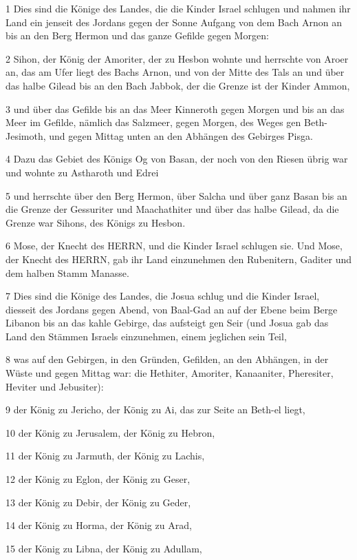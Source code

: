 \par 1 Dies sind die Könige des Landes, die die Kinder Israel schlugen und nahmen ihr Land ein jenseit des Jordans gegen der Sonne Aufgang von dem Bach Arnon an bis an den Berg Hermon und das ganze Gefilde gegen Morgen:
\par 2 Sihon, der König der Amoriter, der zu Hesbon wohnte und herrschte von Aroer an, das am Ufer liegt des Bachs Arnon, und von der Mitte des Tals an und über das halbe Gilead bis an den Bach Jabbok, der die Grenze ist der Kinder Ammon,
\par 3 und über das Gefilde bis an das Meer Kinneroth gegen Morgen und bis an das Meer im Gefilde, nämlich das Salzmeer, gegen Morgen, des Weges gen Beth-Jesimoth, und gegen Mittag unten an den Abhängen des Gebirges Pisga.
\par 4 Dazu das Gebiet des Königs Og von Basan, der noch von den Riesen übrig war und wohnte zu Astharoth und Edrei
\par 5 und herrschte über den Berg Hermon, über Salcha und über ganz Basan bis an die Grenze der Gessuriter und Maachathiter und über das halbe Gilead, da die Grenze war Sihons, des Königs zu Hesbon.
\par 6 Mose, der Knecht des HERRN, und die Kinder Israel schlugen sie. Und Mose, der Knecht des HERRN, gab ihr Land einzunehmen den Rubenitern, Gaditer und dem halben Stamm Manasse.
\par 7 Dies sind die Könige des Landes, die Josua schlug und die Kinder Israel, diesseit des Jordans gegen Abend, von Baal-Gad an auf der Ebene beim Berge Libanon bis an das kahle Gebirge, das aufsteigt gen Seir (und Josua gab das Land den Stämmen Israels einzunehmen, einem jeglichen sein Teil,
\par 8 was auf den Gebirgen, in den Gründen, Gefilden, an den Abhängen, in der Wüste und gegen Mittag war: die Hethiter, Amoriter, Kanaaniter, Pheresiter, Heviter und Jebusiter):
\par 9 der König zu Jericho, der König zu Ai, das zur Seite an Beth-el liegt,
\par 10 der König zu Jerusalem, der König zu Hebron,
\par 11 der König zu Jarmuth, der König zu Lachis,
\par 12 der König zu Eglon, der König zu Geser,
\par 13 der König zu Debir, der König zu Geder,
\par 14 der König zu Horma, der König zu Arad,
\par 15 der König zu Libna, der König zu Adullam,
